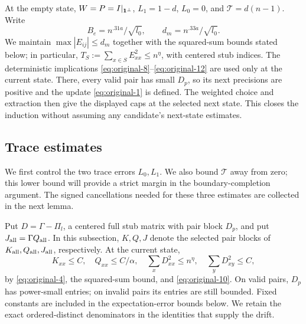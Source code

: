 At the empty state, \(W=P=I|_{{\bf1}^\perp}\),
\(L_1=1-d\), \(L_0=0\), and \(\mathcal T=d(n-1)\).
Write
\[
 B_e=n^{.31a}/\sqrt{l_0},\qquad d_m=n^{.33a}/\sqrt{l_0}.
\]
We maintain \(\max|E_{ij}|\le d_m\) together with the squared-sum bounds
stated below; in particular,
\(T_S:=\sum_{x\in S} E_{xx}^2\le n^\eta\), with centered stub indices.
The deterministic implications \eqref{eq:original-8}--\eqref{eq:original-12}
are used only at the current state. There, every valid pair has small
\(D_p\), so its next precisions are positive and the update
\eqref{eq:original-1} is defined. The weighted choice and extraction then
give the displayed caps at the selected next state. This closes the
induction without assuming any candidate's next-state estimates.

\subsection{Trace estimates}

We first control the two trace errors $L_0,L_1$. We also bound
$\mathcal T$ away from zero; this lower bound will provide a strict
margin in the boundary-completion argument. The signed cancellations
needed for these three estimates are collected in the next lemma.

Put \(D=\Gamma-\Pi_l\), a centered full stub matrix with pair block
\(D_p\), and put \(J_{\rm all}=\Gamma Q_{\rm all}\).
In this subsection, \(K,Q,J\) denote the selected pair blocks
of \(K_{\rm all},Q_{\rm all},J_{\rm all}\), respectively.
At the current state,
\begin{equation}
 K_{xx}\le C,\quad Q_{xx}\le C/\alpha,\quad
 \sum_x D_{xx}^2\le n^\eta,\quad \sum_y D_{xy}^2\le C,
\label{eq:original-14}
\end{equation}
by \eqref{eq:original-4}, the squared-sum bound, and
\eqref{eq:original-10}. On valid pairs, \(D_p\) has power-small entries;
on invalid pairs its entries are still bounded. Fixed constants are
included in the expectation-error bounds below. We retain the exact
ordered-distinct denominators in the identities that supply the drift.

